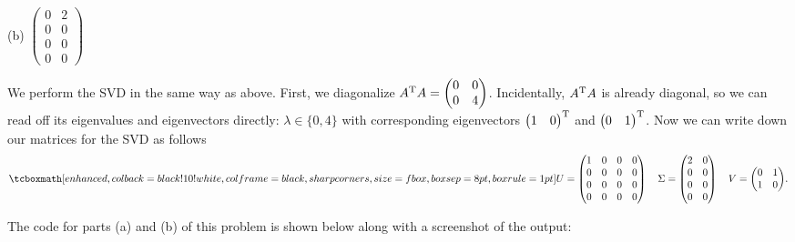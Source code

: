 (b) $
\begin{pmatrix}
    0 & 2 \\
    0 & 0 \\
    0 & 0 \\
    0 & 0
\end{pmatrix}
$

We perform the SVD in the same way as above.
First, we diagonalize $A^{\rm T}A = \begin{pmatrix}0 & 0 \\ 0 & 4\end{pmatrix}$.
Incidentally, $A^{\rm T}A$ is already diagonal, so we can read off its eigenvalues and eigenvectors directly: $\lambda \in \{ 0,4 \} $ with corresponding eigenvectors $\begin{pmatrix}1 & 0\end{pmatrix}^{\rm T}$ and $\begin{pmatrix}0 & 1\end{pmatrix}^{\rm T}$.
Now we can write down our matrices for the SVD as follows
\begin{eqnarray}
    \label{eq:SVD-matrices}
    \eqbox{
    U = 
    \begin{pmatrix}
        1 & 0 & 0 & 0 \\
        0 & 0 & 0 & 0 \\
        0 & 0 & 0 & 0 \\
        0 & 0 & 0 & 0 
    \end{pmatrix}
    \quad
    \Sigma = 
    \begin{pmatrix}
        2 & 0 \\
        0 & 0 \\
        0 & 0 \\
        0 & 0 
    \end{pmatrix}
    \quad
    V = 
    \begin{pmatrix}
        0 & 1 \\
        1 & 0
    \end{pmatrix}
    }
.\end{eqnarray}

The code for parts (a) and (b) of this problem is shown below along with a screenshot of the output:


